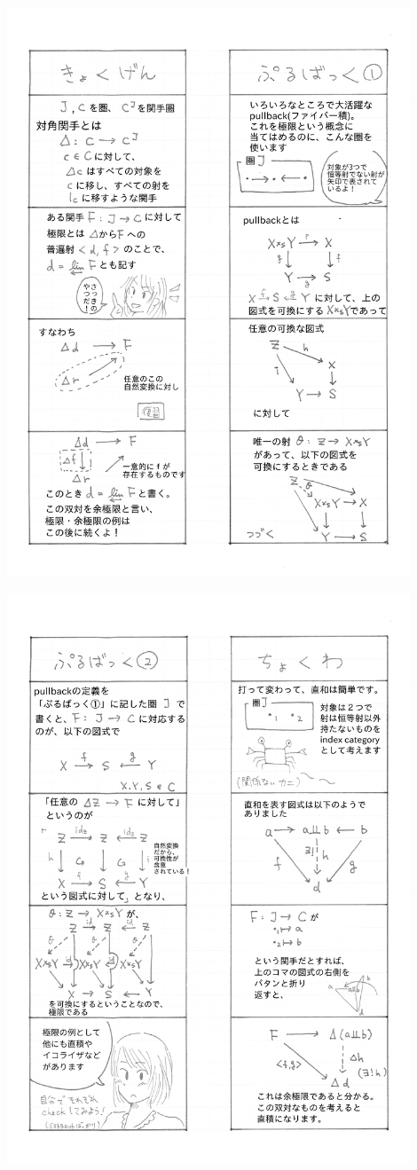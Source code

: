 \clearpage
{}
\begin{center}
\includegraphics[width=0.9\textwidth]{kobaken3.png}
\end{center}
\begin{center}
\includegraphics[width=0.9\textwidth]{kobaken4.png}
\end{center}
